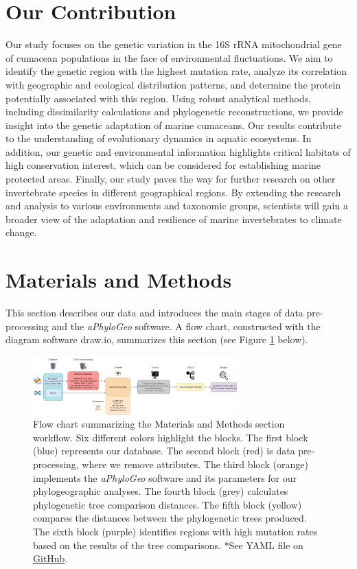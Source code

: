 \section{Our Contribution}\label{contribution}

Our study focuses on the genetic variation in the 16S rRNA mitochondrial gene of cumacean populations in the face of environmental fluctuations. We aim to identify the genetic region with the highest mutation rate, analyze its correlation with geographic and ecological distribution patterns, and determine the protein potentially associated with this region. Using robust analytical methods, including dissimilarity calculations and phylogenetic reconstructions, we provide insight into the genetic adaptation of marine cumaceans. Our results contribute to the understanding of evolutionary dynamics in aquatic ecosystems. In addition, our genetic and environmental information highlights critical habitats of high conservation interest, which can be considered for establishing marine protected areas. Finally, our study paves the way for further research on other invertebrate species in different geographical regions. By extending the research and analysis to various environments and taxonomic groups, scientists will gain a broader view of the adaptation and resilience of marine invertebrates to climate change.

\section{Materials and Methods}\label{materials-methods}
This section describes our data and introduces the main stages of data pre-processing and the \textit{aPhyloGeo} software. A flow chart, constructed with the diagram software draw.io, summarizes this section (see Figure \ref{fig:fig1} below).

\begin{figure}[htbp]
    \centering
    \includegraphics[width=0.7\textwidth]{diagram.drawio.png}
    \caption{Flow chart summarizing the Materials and Methods section workflow. Six different colors highlight the blocks. The first block (blue) represents our database. The second block (red) is data pre-processing, where we remove attributes. The third block (orange) implements the \textit{aPhyloGeo} software and its parameters for our phylogeographic analyses. The fourth block (grey) calculates phylogenetic tree comparison distances. The fifth block (yellow) compares the distances between the phylogenetic trees produced. The sixth block (purple) identifies regions with high mutation rates based on the results of the tree comparisons. *See YAML file on \href{https://github.com/tahiri-lab/aPhyloGeo}{GitHub}. \label{fig:fig1}}
\end{figure}

